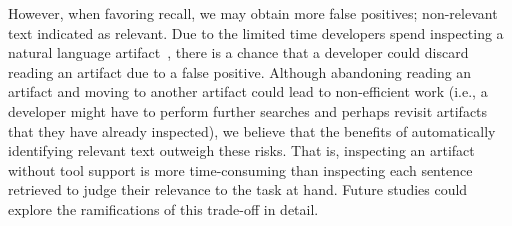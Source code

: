 












However, when favoring recall,  we may obtain more false positives; non-relevant text indicated as relevant.
Due to the limited time developers spend inspecting a natural language artifact~\cite{Starke2009}, there is a chance that
 a developer could discard reading an artifact due to a false positive. 
 Although abandoning reading an artifact and moving to another artifact could lead to non-efficient work
 (i.e., a developer might have to perform further searches and perhaps revisit artifacts that they have already inspected),
we believe that the benefits of automatically identifying relevant text outweigh these risks. 
That is, inspecting an artifact without tool support is more time-consuming
than inspecting each sentence retrieved to judge their relevance to the task at hand. 
Future studies could explore the ramifications
of this trade-off in detail.

